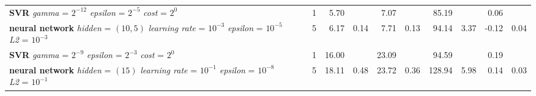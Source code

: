 \begin{table}[ht]
\begin{tabular}{lllrrrrrrrrr}
  \makecell[tl]{\textbf{SVR}\\ \textit{gamma} = $2^{-12}$ \\ \textit{epsilon} = $2^{-5}$ \\ \textit{cost} = $2^{0}$} & \cellcolor[HTML]{FFFF88}{summer} & \cellcolor[HTML]{EADAFF}{seasonal} &   1 & 5.70 &  & 7.07 &  & 85.19 &  & 0.06 &  \\ 
  \makecell[tl]{\textbf{neural network}\\ \textit{hidden} = $(10, 5)$ \\ \textit{learning rate} = $10^{-3}$ \\ \textit{epsilon} = $10^{-5}$ \\ \textit{L2} = $10^{-3}$} & \cellcolor[HTML]{FFFF88}{summer} & \cellcolor[HTML]{EADAFF}{seasonal} &   5 & 6.17 & 0.14 & 7.71 & 0.13 & 94.14 & 3.37 & -0.12 & 0.04 \\ 
  \makecell[tl]{\textbf{SVR}\\ \textit{gamma} = $2^{-9}$ \\ \textit{epsilon} = $2^{-3}$ \\ \textit{cost} = $2^{0}$} & \cellcolor[HTML]{FFAA88}{autumn} & \cellcolor[HTML]{FFFFFF}{all} &   1 & 16.00 &  & 23.09 &  & 94.59 &  & 0.19 &  \\ 
  \makecell[tl]{\textbf{neural network}\\ \textit{hidden} = $(15)$ \\ \textit{learning rate} = $10^{-1}$ \\ \textit{epsilon} = $10^{-8}$ \\ \textit{L2} = $10^{-1}$} & \cellcolor[HTML]{FFAA88}{autumn} & \cellcolor[HTML]{EADAFF}{seasonal} &   5 & 18.11 & 0.48 & 23.72 & 0.36 & 128.94 & 5.98 & 0.14 & 0.03 \\ 
   \bottomrule
\end{tabular}
\endgroup
\end{table}
